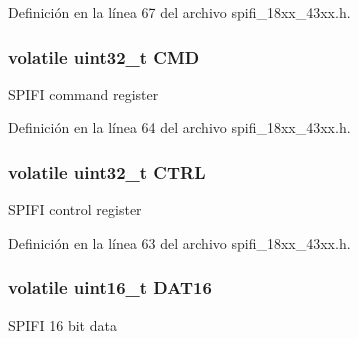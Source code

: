 Definición en la línea 67 del archivo spifi\+\_\+18xx\+\_\+43xx.\+h.

\subsubsection[{\texorpdfstring{C\+MD}{CMD}}]{\setlength{\rightskip}{0pt plus 5cm}volatile uint32\+\_\+t C\+MD}\hypertarget{struct_l_p_c___s_p_i_f_i___c_h_i_p_h_w_a4e290faccf19d747f3cc7ad223da366e}{}\label{struct_l_p_c___s_p_i_f_i___c_h_i_p_h_w_a4e290faccf19d747f3cc7ad223da366e}
S\+P\+I\+FI command register 

Definición en la línea 64 del archivo spifi\+\_\+18xx\+\_\+43xx.\+h.

\subsubsection[{\texorpdfstring{C\+T\+RL}{CTRL}}]{\setlength{\rightskip}{0pt plus 5cm}volatile uint32\+\_\+t C\+T\+RL}\hypertarget{struct_l_p_c___s_p_i_f_i___c_h_i_p_h_w_acc539c9ddc2ca217f7977155acbead90}{}\label{struct_l_p_c___s_p_i_f_i___c_h_i_p_h_w_acc539c9ddc2ca217f7977155acbead90}
S\+P\+I\+FI control register 

Definición en la línea 63 del archivo spifi\+\_\+18xx\+\_\+43xx.\+h.

\subsubsection[{\texorpdfstring{D\+A\+T16}{DAT16}}]{\setlength{\rightskip}{0pt plus 5cm}volatile uint16\+\_\+t D\+A\+T16}\hypertarget{struct_l_p_c___s_p_i_f_i___c_h_i_p_h_w_a5190579c5c09890c1714a00a9e984b73}{}\label{struct_l_p_c___s_p_i_f_i___c_h_i_p_h_w_a5190579c5c09890c1714a00a9e984b73}
S\+P\+I\+FI 16 bit data 

